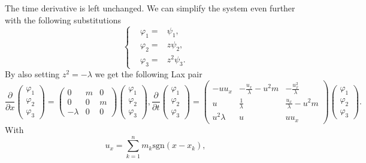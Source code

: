 \documentclass[english,master]{liumaiex}
\theoremstyle{plain}
\theoremstyle{definition}
\newcommand{\sgn}{\text{sgn}}
\begin{document}
The time derivative is left unchanged. We can simplify the system even further with the following substitutions
\begin{equation}
\left\{ \begin{aligned}
	&\varphi_1 = &\psi_1, \\
	&\varphi_2 = &z\psi_2, \\
	&\varphi_3 = &z^2\psi_3.
\end{aligned} \right.
\end{equation}
By also setting $z^2 = -\lambda$ we get the following Lax pair
\begin{subequations}
\begin{equation}
\frac{\partial}{\partial x}
\begin{pmatrix} \varphi_1 \\ \varphi_2 \\ \varphi_3 \end{pmatrix} =
\begin{pmatrix}
	0 & m & 0 \\
	0 & 0 & m \\
	-\lambda & 0 & 0
\end{pmatrix}
\begin{pmatrix} \varphi_1 \\ \varphi_2 \\ \varphi_3 \end{pmatrix}
,
\end{equation}
\begin{equation}
\frac{\partial}{\partial t}
\begin{pmatrix} \varphi_1 \\ \varphi_2 \\ \varphi_3 \end{pmatrix} =
\begin{pmatrix}
	-u u_x & -\frac{u_x}{\lambda}-u^2 m & -\frac{u_x^2}{\lambda} \\
	u & \frac{1}{\lambda} & \frac{u_x}{\lambda} - u^2 m \\
	u^2\lambda & u & uu_x
\end{pmatrix}
\begin{pmatrix} \varphi_1 \\ \varphi_2 \\ \varphi_3 \end{pmatrix}
.
\end{equation}
\end{subequations}
%
%
With
\begin{equation}
	u_x = \sum_{k=1}^n m_k \sgn(x - x_k),
\end{equation}
\end{document}
